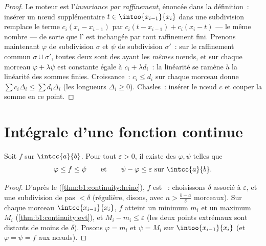 \begin{proof}
Le moteur est l'\emph{invariance par raffinement}, énoncée dans la
définition~: insérer un nœud supplémentaire $t \in
\intoo{x_{i-1}}{x_i}$ dans une subdivision remplace le terme
$c_i(x_i - x_{i-1})$ par $c_i(t - x_{i-1}) + c_i(x_i - t)$ --- le
même nombre --- de sorte que l' est inchangée par tout
raffinement fini. Prenons maintenant $\varphi$ de subdivision
$\sigma$ et $\psi$ de subdivision $\sigma'$~: sur le raffinement
commun $\sigma \cup \sigma'$, toutes deux sont des  ayant les \emph{mêmes} nœuds, et sur chaque morceau
$\varphi + \lambda\psi$ est constante égale à $c_i + \lambda
d_i$~: la linéarité se ramène à la linéarité des sommes finies.
Croissance~: $c_i \leq d_i$ sur chaque morceau donne $\sum c_i
\Delta_i \leq \sum d_i \Delta_i$ (les longueurs $\Delta_i \geq
0$). Chasles~: insérer le nœud $c$ et couper la somme en ce point.
\end{proof}

\section{Intégrale d'une fonction continue}

\begin{theorem}\label{thm:b1:integration:approx}
Soit $f$  sur $\intcc{a}{b}$. Pour tout $\varepsilon > 0$, il
existe des  $\varphi, \psi$ telles que
\[
\varphi \leq f \leq \psi
\qquad\text{et}\qquad
\psi - \varphi \leq \varepsilon \text{ sur } \intcc{a}{b}.
\]
\end{theorem}

\begin{proof}
D'après le  (\cref{thm:b1:continuity:heine}), $f$ est
~: choisissons $\delta$ associé à $\varepsilon$,
et une subdivision de pas $< \delta$ (régulière, disons, avec $n >
\frac{b - a}{\delta}$ morceaux). Sur chaque morceau 
$\intcc{x_{i-1}}{x_i}$, $f$ atteint un minimum $m_i$ et un maximum
$M_i$ (\cref{thm:b1:continuity:evt}), et $M_i - m_i \leq \varepsilon$
(les deux points extrémaux sont distants de moins de $\delta$).
Posons $\varphi = m_i$ et $\psi = M_i$ sur $\intoo{x_{i-1}}{x_i}$ (et
$\varphi = \psi = f$ aux nœuds).
\end{proof}


